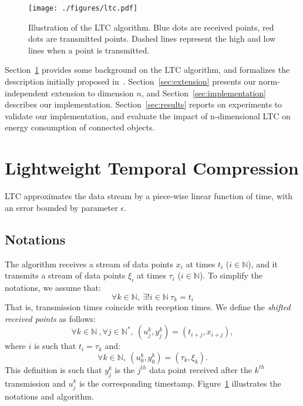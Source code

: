 \documentclass[10pt, conference, compsocconf]{IEEEtran}
\begin{document}
\setlength{\textfloatsep}{0pt}
\begin{figure}[b]
\centering
\texttt{[image: ./figures/ltc.pdf]}
\caption{Illustration of the LTC algorithm. Blue 
dots are received points, red dots are transmitted points. Dashed lines 
represent the high and low lines when a point is 
transmitted.\vspace*{-0.3cm}}
\label{fig:ltc}
\end{figure}

Section~\ref{sec:ltc} provides some background on the LTC algorithm, 
and formalizes the description initially proposed 
in~\cite{schoellhammer2004lightweight}. Section~\ref{sec:extension} 
presents our norm-independent extension to dimension $n$, and 
Section~\ref{sec:implementation} describes our implementation. 
Section~\ref{sec:results} reports on experiments to validate our 
implementation, and evaluate the impact of n-dimensional LTC on 
energy consumption of connected objects.

\newpage

\section{Lightweight Temporal Compression}
\label{sec:ltc}

LTC approximates the data stream
by a piece-wise linear function of time, with an error bounded by parameter $\epsilon$.

\subsection{Notations}

The algorithm receives a stream of data points $x_i$
at times $t_i$ ($i \in \mathbb{N}$), and it transmits a stream of data points $\xi_i$
at times $\tau_i$ ($i \in \mathbb{N}$). To simplify the notations, we assume that:
\begin{equation*}
\forall k \in \mathbb{N}, \  \exists ! i \in \mathbb{N} \  \tau_k = t_i
\end{equation*}
That is, transmission times coincide with reception times.
We define the \emph{shifted received points} as follows:
\begin{equation*}
\forall k \in \mathbb{N}\ , \forall j \in \mathbb{N^*},\ (u^k_j, y^k_j) = (t_{i+j}, x_{i+j}), 
\end{equation*}
where $i$ is such that $t_i = \tau_k$ and:
\begin{equation*}
\forall k \in \mathbb{N},\  (u^k_0, y^k_0) = (\tau_k, \xi_k).
\end{equation*}
This definition is such that $y^k_j$ is the $j^{th}$ data point received
after the $k^{th}$ transmission and $u^k_j$ is the corresponding timestamp.
Figure~\ref{fig:ltc} illustrates the notations and algorithm.
\end{document}
